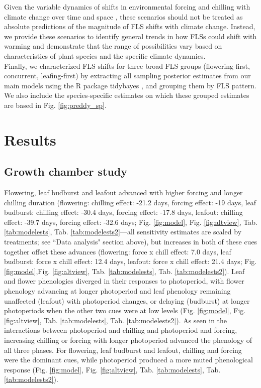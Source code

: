 \documentclass[12pt]{article}\usepackage[]{graphicx}\usepackage[]{color}
\begin{document}
\noindent Given the variable dynamics of shifts in environmental forcing and chilling with climate change over time and space \citep{Luedeling:2011aa}, these scenarios should not be treated as absolute predictions of the magnitude of FLS shifts with climate change. Instead, we provide these scenarios to identify general trends in how FLSs could shift with warming and demonstrate that the range of possibilities vary based on characteristics of plant species and the specific climate dynamics.\\

\noindent Finally, we characterized FLS shifts for three broad FLS groups (flowering-first, concurrent, leafing-first) by extracting all sampling posterior estimates from our main models using the R package tidybayes \citep{Kay2020}, and grouping them by FLS pattern. We also include the species-specific estimates on which these grouped estimates are based in Fig. \ref{fig:preddy_sp}.  \\ 

\section*{Results} 
\subsection*{Growth chamber study} 
\noindent  Flowering, leaf budburst and leafout advanced with higher forcing and longer chilling duration (flowering: chilling effect: -21.2 days, forcing effect: -19 days, leaf budburst: chilling effect: -30.4 days, forcing effect: -17.8 days, leafout: chilling effect: -39.7 days, forcing effect: -32.6 days; Fig. \ref{fig:model}, Fig. \ref{fig:altview}, Tab. \ref{tab:modelests}, Tab. \ref{tab:modelests2}---all sensitivity estimates are scaled by treatments; see ``Data analysis" section above), but increases in both of these cues together offset these advances (flowering: force x chill effect: 7.0 days, leaf budburst: force x chill effect: 12.4 days, leafout: force x chill effect: 21.4 days; Fig. \ref{fig:model},Fig. \ref{fig:altview}, Tab. \ref{tab:modelests}, Tab. \ref{tab:modelests2}). Leaf and flower phenologies diverged in their responses to photoperiod, with flower phenology advancing at longer photoperiod and leaf phenology  remaining unaffected (leafout) with photoperiod changes, or delaying (budburst) at longer photoperiods when the other two cues were at low levels (Fig. \ref{fig:model}, Fig. \ref{fig:altview}, Tab. \ref{tab:modelests}, Tab. \ref{tab:modelests2}). As seen in the interactions between photoperiod and chilling and photoperiod and forcing, increasing chilling or forcing with longer photoperiod advanced the phenology of all three phases. For flowering, leaf budburst and leafout, chilling and forcing were the dominant cues, while photoperiod produced a more muted phenological response (Fig. \ref{fig:model}, Fig. \ref{fig:altview}, Tab. \ref{tab:modelests}, Tab. \ref{tab:modelests2}). \\
\end{document}
